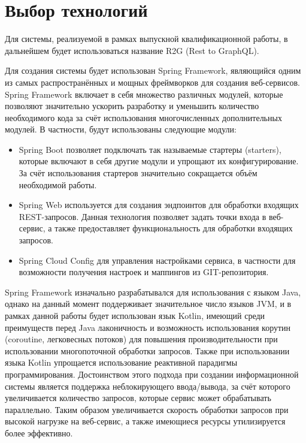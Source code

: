 \section{Выбор технологий}\label{sec:choose-technology}

Для системы, реализуемой в рамках выпускной квалификационной работы, в дальнейшем будет использоваться название R2G (Rest to GraphQL).

Для создания системы будет использован Spring Framework, являющийся одним из самых распространённых и мощных фреймворков для создания веб-сервисов.
Spring Framework включает в себя множество различных модулей, которые позволяют значительно ускорить разработку и уменьшить количество необходимого кода за счёт использования многочисленных дополнительных модулей.
В частности, будут использованы следующие модули:

\begin{itemize}
	\item Spring Boot позволяет подключать так называемые стартеры (starters), которые включают в себя другие модули и упрощают их конфигурирование.
	За счёт использования стартеров значительно сокращается объём необходимой работы.

	\item Spring Web используется для создания эндпоинтов для обработки входящих REST-запросов. %
	Данная технология позволяет задать точки входа в веб-сервис, а также предоставляет функциональность для обработки входящих запросов.

	\item Spring Cloud Config для управления настройками сервиса, в частности для возможности получения настроек и маппингов из GIT-репозитория.
\end{itemize}

Spring Framework изначально разрабатывался для использования с языком Java, однако на данный момент поддерживает значительное число языков JVM, и в рамках данной работы будет использован язык Kotlin, имеющий среди преимуществ перед Java лаконичность и возможность использования корутин (coroutine, легковесных потоков) для повышения производительности при использовании многопоточной обработки запросов.
Также при использовании языка Kotlin упрощается использование реактивной парадигмы программирования.
Достоинством этого подхода при создании информационной системы является поддержка неблокирующего ввода/вывода, за счёт которого увеличивается количество запросов, которые сервис может обрабатывать параллельно.
Таким образом увеличивается скорость обработки запросов при высокой нагрузке на веб-сервис, а также имеющиеся ресурсы утилизируется более эффективно.

